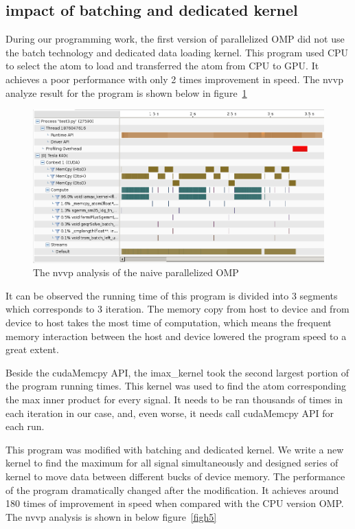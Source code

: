 \documentclass[english]{cccconf}
\begin{document}
\subsection{impact of batching and dedicated kernel}
During our programming work, the first version of parallelized OMP did not use the batch technology and dedicated data loading kernel. This program used CPU to select the atom to load and transferred the atom from CPU to GPU. It achieves a poor performance with only 2 times improvement in speed. The nvvp analyze result for the program is shown below in figure~\ref{figh4}

\begin{figure}[!htb]
	\centering
	\includegraphics[width=450pt]{4.png}
	\caption{The nvvp analysis of the naive parallelized OMP}
	\label{figh4}
\end{figure} 

It can be observed the running time of this program is divided into 3 segments which corresponds to 3 iteration. The memory copy from host to device and from device to host takes the most time of computation, which means the frequent memory interaction between the host and device lowered the program speed to a great extent.

Beside the cudaMemcpy API, the imax\_kernel took the second largest portion of the program running times. This kernel was used to find the atom corresponding the max inner product for every signal. It needs to be ran thousands of times in  each iteration in our case, and, even worse, it needs call cudaMemcpy API for each run. 

This program was modified with batching and dedicated kernel. We write a new kernel to find the maximum for all signal simultaneously and designed series of kernel to move data between different bucks of device memory. The performance of the program dramatically changed after the modification. It achieves around 180 times of improvement in speed when compared with the CPU version OMP. The nvvp analysis is shown in below figure~\ref{figh5}
\end{document}
